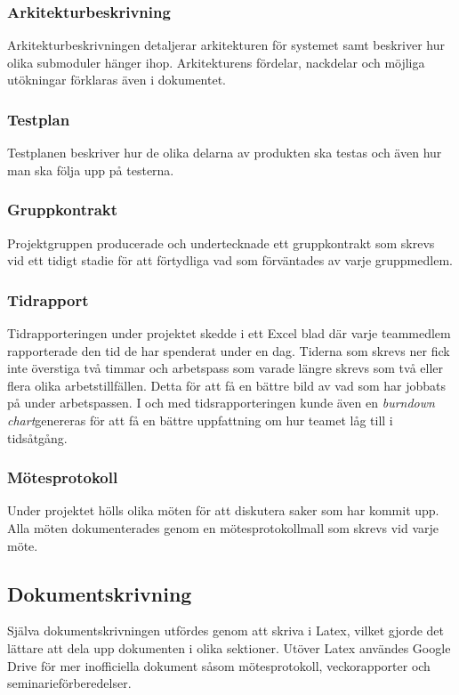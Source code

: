 \subsubsection*{Arkitekturbeskrivning}
Arkitekturbeskrivningen detaljerar arkitekturen för systemet samt beskriver hur olika submoduler hänger ihop. Arkitekturens fördelar, nackdelar och möjliga utökningar förklaras även i dokumentet.

\subsubsection*{Testplan}
Testplanen beskriver hur de olika delarna av produkten ska testas och även hur man ska följa upp på testerna.

\subsubsection*{Gruppkontrakt}
Projektgruppen producerade och undertecknade ett gruppkontrakt som skrevs vid ett tidigt stadie för att förtydliga vad som förväntades av varje gruppmedlem.

\subsubsection*{Tidrapport}
Tidrapporteringen under projektet skedde i ett Excel blad där varje teammedlem rapporterade den tid de har spenderat under en dag. Tiderna som skrevs ner fick inte överstiga två timmar och arbetspass som varade längre skrevs som två eller flera olika arbetstillfällen. Detta för att få en bättre bild av vad som har jobbats på under arbetspassen. I och med tidsrapporteringen kunde även en \textit{burndown chart}genereras för att få en bättre uppfattning om hur teamet låg till i tidsåtgång.

\subsubsection*{Mötesprotokoll}
Under projektet hölls olika möten för att diskutera saker som har kommit upp. Alla möten dokumenterades genom en mötesprotokollmall som skrevs vid varje möte.

\subsection{Dokumentskrivning}
Själva dokumentskrivningen utfördes genom att skriva i Latex, vilket gjorde det lättare att dela upp dokumenten i olika sektioner. Utöver Latex användes Google Drive för mer inofficiella dokument såsom mötesprotokoll, veckorapporter och seminarieförberedelser.

